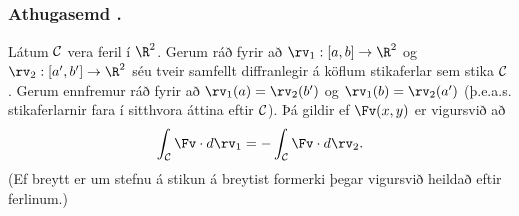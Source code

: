 \subsection{} 

\subsubsection{Athugasemd \kaflanr.}
Látum $\cal C$ vera feril í $\R^2$. Gerum ráð fyrir að $\rv_1:[a,b]\rightarrow \R^2$ og  $\rv_2:[a',b']\rightarrow \R^2$ séu tveir samfellt diffranlegir á köflum stikaferlar sem stika $\cal C$.  Gerum ennfremur ráð fyrir að $\rv_1(a)=\rv_2(b')$ og $\rv_1(b)=\rv_2(a')$ (þ.e.a.s. stikaferlarnir fara í sitthvora áttina eftir $\cal C$).  Þá gildir ef $\Fv(x,y)$ er vigursvið að 
$$\int_{\cal C} \Fv\cdot d\rv_1=-\int_{\cal C} \Fv\cdot d\rv_2.$$
(Ef breytt er um stefnu á stikun á breytist formerki þegar vigursvið heildað eftir ferlinum.)



